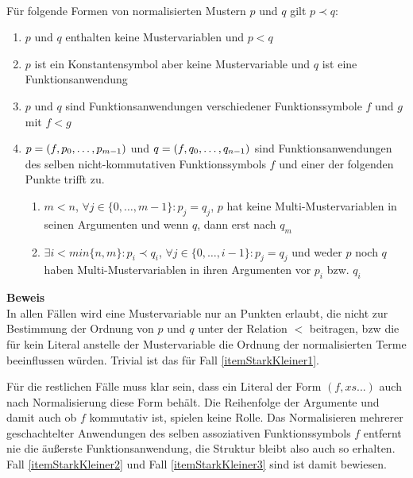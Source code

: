 \begin{lemma}~\\
Für folgende Formen von normalisierten Mustern $p$ und $q$ gilt $p \prec q$:
\begin{enumerate}
	\item{$p$ und $q$ enthalten keine Mustervariablen und $p < q$} \label{itemStarkKleiner1}
	
	\item{$p$ ist ein Konstantensymbol aber keine Mustervariable und $q$ ist eine Funktionsanwendung}  \label{itemStarkKleiner2}
	
	\item{$p$ und $q$ sind Funktionsanwendungen verschiedener Funktionssymbole $f$ und $g$ mit $f < g$}  \label{itemStarkKleiner3}
		
	\item{$p = (f, {p}_{0}, \dots, {p}_{m-1})$ und $q = (f, {q}_{0}, \dots, {q}_{n-1})$ sind Funktionsanwendungen des selben nicht-kommutativen Funktionssymbols $f$ und einer der folgenden Punkte trifft zu.
	\begin{enumerate}
		\item{$m < n$, $\forall j \in \{0, \dots, m-1\} \colon p_j = q_j$, $p$ hat keine Multi-Mustervariablen in seinen Argumenten und wenn $q$, dann erst nach $q_m$}
		\item{$\exists i < min\{n, m\} \colon p_i \prec q_i$, $\forall j \in \{0, \dots, i  - 1\} \colon p_j = q_j$ und weder $p$ noch $q$ haben Multi-Mustervariablen in ihren Argumenten vor $p_i$ bzw. $q_i$}
	\end{enumerate}
	} \label{itemStarkKleiner4}
	
\end{enumerate}
\end{lemma}

\textbf{Beweis}~\\
In allen Fällen wird eine Mustervariable nur an Punkten erlaubt, die nicht zur Bestimmung der Ordnung von $p$ und $q$ unter der Relation $<$ beitragen, bzw die für kein Literal anstelle der Mustervariable die Ordnung der normalisierten Terme beeinflussen würden. Trivial ist das für Fall \ref{itemStarkKleiner1}.

Für die restlichen Fälle muss klar sein, dass ein Literal der Form $(f, xs...)$ auch nach Normalisierung diese Form behält. Die Reihenfolge der Argumente und damit auch ob $f$ kommutativ ist, spielen keine Rolle. Das Normalisieren mehrerer geschachtelter Anwendungen des selben assoziativen Funktionssymbols $f$ entfernt nie die äußerste Funktionsanwendung, die Struktur bleibt also auch so erhalten.
Fall \ref{itemStarkKleiner2} und Fall \ref{itemStarkKleiner3} sind ist damit bewiesen.

